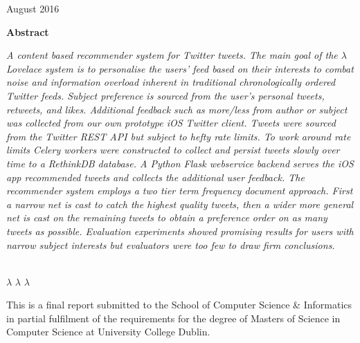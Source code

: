 \documentclass{article}
\begin{document}
\vspace{2.5em}

\begin{center}
     August 2016
\end{center}









\newpage








\begin{center}
    {\Large \textbf{Abstract}} \\
    \vspace{2em}
    \parbox{0.85\textwidth}
    {\textsl{
        A content based recommender system for Twitter tweets. The main goal of the $\lambda$ Lovelace system is to personalise the users' feed based on their interests to combat noise and information overload inherent in traditional chronologically ordered Twitter feeds. Subject preference is sourced from the user’s personal tweets, retweets, and likes. Additional feedback such as \textit{more/less} from \textit{author} or \textit{subject} was collected from our own prototype iOS Twitter client. Tweets were sourced from the Twitter REST API but subject to hefty rate limits. To work around rate limits Celery workers were constructed to collect and persist tweets slowly over time to a RethinkDB database. A Python Flask webservice backend serves the iOS app recommended tweets and collects the additional user feedback. The recommender system employs a two tier term frequency document approach. First a narrow net is cast to catch the highest quality tweets, then a wider more general net is cast on the remaining tweets to obtain a preference order on as many tweets as possible. Evaluation experiments showed promising results for users with narrow subject interests but evaluators were too few to draw firm conclusions.
    }} \\
    \vspace{2em}
    {\scriptsize $\lambda$ $\lambda$ $\lambda$}
\end{center}

\noindent This is a final report submitted to the School of Computer Science \& Informatics in partial fulfilment of the requirements for the degree of Masters of Science in Computer Science at University College Dublin.
\end{document}
